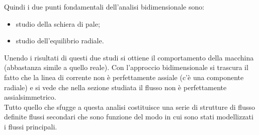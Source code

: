 Quindi i due punti fondamentali dell'analisi bidimensionale sono:
\begin{itemize}
\item studio della schiera di pale;
\item studio dell'equilibrio radiale.
\end{itemize}
Unendo i risultati di questi due studi si ottiene il comportamento della macchina (abbastanza simile a quello reale).
Con l’approccio bidimensionale si trascura il fatto che la linea di corrente non è perfettamente assiale (c'è una componente radiale) e si vede che nella sezione studiata il flusso non è perfettamente assialsimmetrico.\\
Tutto quello che sfugge a questa analisi costituisce una serie di strutture di flusso definite flussi secondari che sono funzione del modo in cui sono stati modellizzati i flussi principali.
